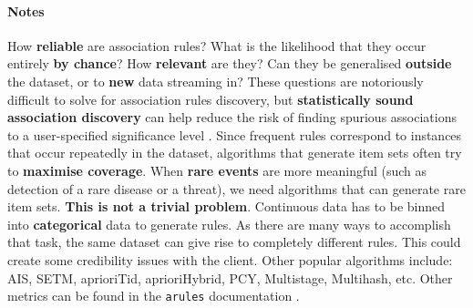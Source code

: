 \paragraph{Notes}
How \textbf{reliable} are association rules? What is the likelihood that they occur entirely \textbf{by chance}? How \textbf{relevant} are they? Can they be generalised \textbf{outside} the dataset, or to \textbf{new} data streaming in?  These questions are notoriously difficult to solve for association rules discovery, but \textbf{statistically sound association discovery} can help reduce the risk of finding spurious associations to a user-specified significance level \cite{DSML_AR5,DSML_AR6}.
\newl Since frequent rules correspond to instances that occur repeatedly in the dataset, algorithms that generate item sets often try to \textbf{maximise coverage}. When \textbf{rare events} are more meaningful (such as detection of a rare disease or a threat), we need algorithms that can generate rare item sets. \textbf{This is not a trivial problem}. 
\newl Continuous data has to be binned into \textbf{categorical} data to generate rules. As there are many ways to accomplish that task, the same dataset can give rise to completely different rules. This could create some credibility issues with the client.  
\newl Other popular algorithms include: AIS, SETM, aprioriTid, aprioriHybrid, PCY, Multistage, Multihash, etc. Other metrics can be found in the \texttt{arules} documentation \cite{DSML_AR2}.

